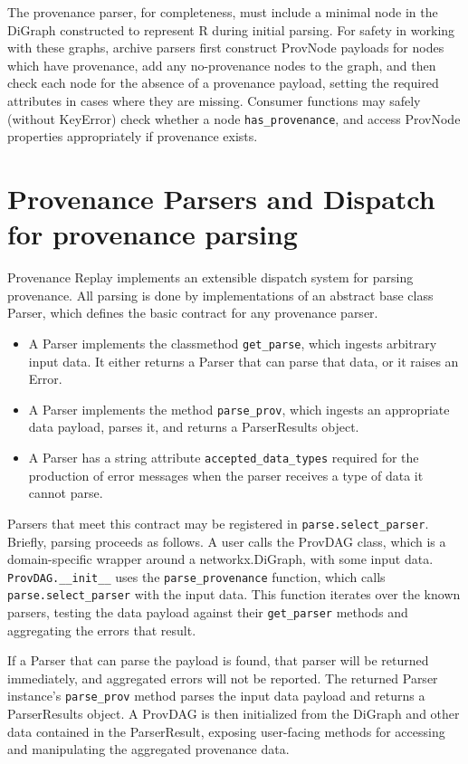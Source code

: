 The provenance parser, for completeness, must include a minimal node in the
DiGraph constructed to represent R during initial parsing. For safety in working
with these graphs, archive parsers first construct ProvNode payloads for nodes
which have provenance, add any no-provenance nodes to the graph, and then check
each node for the absence of a provenance payload, setting the required
attributes in cases where they are missing. Consumer functions may safely
(without KeyError) check whether a node \texttt{has\_provenance}, and access ProvNode
properties appropriately if provenance exists.

\section{Provenance Parsers and Dispatch for provenance parsing}

Provenance Replay implements an extensible dispatch system for parsing
provenance. All parsing is done by implementations of an abstract base class
Parser, which defines the basic contract for any provenance parser. 
\begin{itemize}
    \item A Parser implements the classmethod \texttt{get\_parse}, which ingests arbitrary input data. It either returns a Parser that can parse that data, or it raises an Error.
    \item A Parser implements the method \texttt{parse\_prov}, which ingests an appropriate data payload, parses it, and returns a ParserResults object.
    \item A Parser has a string attribute \texttt{accepted\_data\_types} required for the production of error messages when the parser receives a type of data it cannot parse.
\end{itemize}

Parsers that meet this contract may be registered in \texttt{parse.select\_parser}.
Briefly, parsing proceeds as follows. A user calls the ProvDAG class, which is a
domain-specific wrapper around a networkx.DiGraph, with some input data.
\texttt{ProvDAG.\_\_init\_\_} uses the \texttt{parse\_provenance} function, which calls
\texttt{parse.select\_parser} with the input data. This function iterates over the known
parsers, testing the data payload against their \texttt{get\_parser} methods and
aggregating the errors that result. 

If a Parser that can parse the payload is found, that parser will be returned
immediately, and aggregated errors will not be reported. The returned Parser
instance’s \texttt{parse\_prov} method parses the input data payload and returns a
ParserResults object. A ProvDAG is then initialized from the DiGraph and other
data contained in the ParserResult, exposing user-facing methods for accessing
and manipulating the aggregated provenance data.

